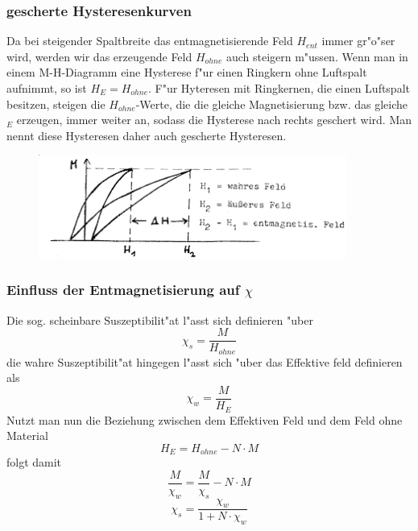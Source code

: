         \subsubsection*{gescherte Hysteresenkurven}
            Da bei steigender Spaltbreite das entmagnetisierende Feld $H_{ent}$ immer gr"o"ser wird, werden wir das erzeugende Feld $H_{ohne}$
            auch steigern m"ussen. Wenn man in einem M-H-Diagramm eine Hysterese f"ur einen Ringkern
            ohne Luftspalt aufnimmt, so ist $H_{E}=H_{ohne}$. F"ur Hyteresen mit Ringkernen,
            die einen Luftspalt besitzen, steigen die $H_{ohne}$-Werte, die die gleiche Magnetisierung
            bzw. das gleiche $_{E}$ erzeugen, immer weiter an, sodass die Hysterese nach rechts
            geschert wird. Man nennt diese Hysteresen daher auch gescherte Hysteresen.
            \begin{figure}
                \centering
                \includegraphics[width=0.9\textwidth]{Images/geschert.png}
            \end{figure}

        \subsubsection*{Einfluss der Entmagnetisierung auf $\chi$}
            Die sog. scheinbare Suszeptibilit"at l"asst sich definieren "uber
            \begin{equation}
                \chi_s = \frac{M}{H_{ohne}}
            \end{equation}
            die wahre Suszeptibilit"at hingegen l"asst sich "uber das Effektive feld definieren als
            \begin{equation}
                \chi_w = \frac{M}{H_{E}}
            \end{equation}
            Nutzt man nun die Beziehung zwischen dem Effektiven Feld und dem Feld ohne Material
            \begin{equation}
                H_E = H_{ohne} - N\cdot M
            \end{equation}
            folgt damit
            \begin{equation}
                \frac{M}{\chi_w} = \frac{M}{\chi_s} - N \cdot M
            \end{equation}
            \begin{equation}
                \chi_s = \frac{\chi_w}{1+N\cdot \chi_w}
            \end{equation}
